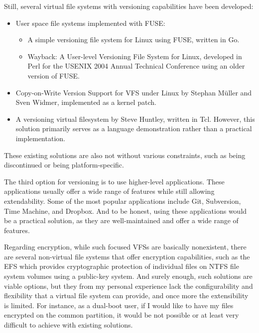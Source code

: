 Still, several virtual file systems with versioning capabilities have been developed:

\begin{itemize}
    \item User space file systems implemented with FUSE:
    \begin{itemize}
        \item A simple versioning file system for Linux using FUSE\cite{simple_vfs}, written in Go.
        \item Wayback: A User-level Versioning File System for Linux\cite{wayback_vfs}, developed in Perl for the USENIX 2004 Annual Technical Conference using an older version of FUSE\@.
    \end{itemize}
    \item Copy-on-Write Version Support for VFS under Linux by Stephan Müller and Sven Widmer\cite{vvfs}, implemented as a kernel patch.
    \item A versioning virtual filesystem by Steve Huntley\cite{huntley_vvfs}, written in Tcl.
    However, this solution primarily serves as a language demonstration rather than a practical implementation.
\end{itemize}

These existing solutions are also not without various constraints, such as being discontinued or being platform-specific.

The third option for versioning is to use higher-level applications.
These applications usually offer a wide range of features while still allowing extendability.
Some of the most popular applications include Git, Subversion, Time Machine, and Dropbox.
And to be honest, using these applications would be a practical solution, as they are well-maintained and offer a wide range of features.

Regarding encryption, while such focused VFSs are basically nonexistent, there are several non-virtual file systems that offer encryption capabilities, such as the EFS which provides cryptographic protection of individual files on NTFS file system volumes using a public-key system.
And surely enough, such solutions are viable options, but they from my personal experience lack the configurability and flexibility that a virtual file system can provide, and once more the extensibility is limited.
For instance, as a dual-boot user, if I would like to have my files encrypted on the common partition, it would be not possible or at least very difficult to achieve with existing solutions.

